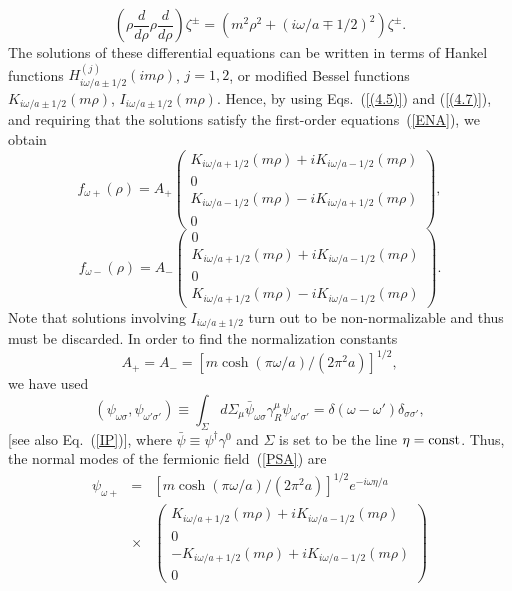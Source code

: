 \documentclass[12pt,nofootinbib,floatfix,aps,prd,showpacs,amsmath,amssymb,eqsecnum]{revtex4-2}
\let\cite\citep
\begin{document}
\begin{equation}
\left( \rho\frac{d}{d\rho}\rho\frac{d}{d\rho} \right) \zeta^\pm 
= 
(m^2\rho^2+(i\omega/a \mp 1/2)^2) \zeta^\pm.
\label{(4.82)}
\end{equation}
The solutions of these differential equations can be written
in terms of Hankel functions 
$ H^{(j)}_{i\omega/a \pm 1/2}(im\rho)$, $j=1,2$,  
or modified Bessel functions 
$ 
K_{i \omega/a \pm 1/2}(m\rho)
$, 
$
I_{i \omega/a \pm 1/2}(m\rho)
$.
Hence, by using Eqs.~(\ref{(4.5)}) and (\ref{(4.7)}), 
and requiring that the solutions  satisfy the 
first-order equations~(\ref{ENA}), we obtain 
$$
f_{\omega +} (\rho) = 
A_+ 
\left(
\begin{array}{c}
   K_{i \omega/a + 1/2}(m\rho) +
   i K_{i \omega/a - 1/2}(m\rho) \\
0 \\
   K_{i \omega/a - 1/2}(m\rho) -
   i K_{i \omega/a + 1/2}(m\rho) \\
0
\end{array}
\right),
$$
$$
f_{\omega -} (\rho) =  
A_- 
\left(
\begin{array}{c}
0\\
   K_{i \omega/a + 1/2}(m\rho) +
   i K_{i \omega/a - 1/2}(m\rho) \\
0\\
   K_{i \omega/a + 1/2}(m\rho) -
   i K_{i \omega/a - 1/2}(m\rho)
\end{array}
\right).
$$
Note that solutions involving $I_{i \omega/a \pm 1/2}$ turn out to be 
non-normalizable and thus must be discarded.
In order to find the normalization constants 
\begin{equation}
A_+=A_-= [{m \cosh (\pi \omega/a)}/{(2\pi^2 a)}]^{1/2},
\label{CONST}
\end{equation} 
we  have used \cite{Birrelletal82} 
\begin{equation}
(
\psi_{\omega \sigma} , \psi_{\omega' \sigma'} 
) 
\equiv 
\int_\Sigma d\Sigma_\mu 
\bar \psi_{\omega \sigma} \gamma^\mu_R 
\psi_{\omega' \sigma'}
=
\delta(\omega-\omega') \delta_{\sigma \sigma'},
\label{IP2}
\end{equation}
[see also Eq.~(\ref{IP})], where 
$\bar \psi \equiv \psi^\dagger \gamma^0$ 
and  $\Sigma$ is set to be the line $\eta={\rm const}$.
Thus, the normal modes of the fermionic field~(\ref{PSA}) are 
\begin{eqnarray}
\psi_{\omega +} 
&=&  
[{m \cosh (\pi \omega/a)}/{(2 \pi^2 a)}]^{1/2}
e^{-i\omega \eta/a}
\nonumber \\
&\times& 
\left(
\begin{array}{c}
K_{i \omega/a + 1/2}(m\rho) +
i K_{i \omega/a - 1/2}(m\rho) \\
0\\
-K_{i \omega/a + 1/2}(m\rho) +
i K_{i \omega/a - 1/2}(m\rho) \\
0
\end{array}
\right)
\nonumber \\
\label{RNM1}
\end{eqnarray}
\end{document}
